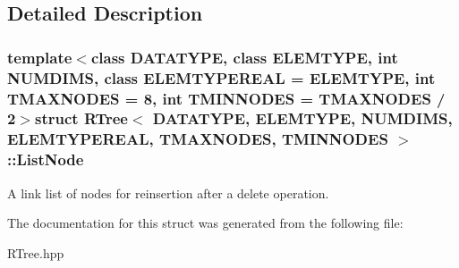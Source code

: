 \subsection{\-Detailed \-Description}
\subsubsection*{template$<$class \-D\-A\-T\-A\-T\-Y\-P\-E, class \-E\-L\-E\-M\-T\-Y\-P\-E, int \-N\-U\-M\-D\-I\-M\-S, class \-E\-L\-E\-M\-T\-Y\-P\-E\-R\-E\-A\-L = \-E\-L\-E\-M\-T\-Y\-P\-E, int \-T\-M\-A\-X\-N\-O\-D\-E\-S = 8, int \-T\-M\-I\-N\-N\-O\-D\-E\-S = \-T\-M\-A\-X\-N\-O\-D\-E\-S / 2$>$struct R\-Tree$<$ D\-A\-T\-A\-T\-Y\-P\-E, E\-L\-E\-M\-T\-Y\-P\-E, N\-U\-M\-D\-I\-M\-S, E\-L\-E\-M\-T\-Y\-P\-E\-R\-E\-A\-L, T\-M\-A\-X\-N\-O\-D\-E\-S, T\-M\-I\-N\-N\-O\-D\-E\-S $>$\-::\-List\-Node}

\-A link list of nodes for reinsertion after a delete operation. 

\-The documentation for this struct was generated from the following file\-:\begin{DoxyCompactItemize}
\item 
\-R\-Tree.\-hpp\end{DoxyCompactItemize}
